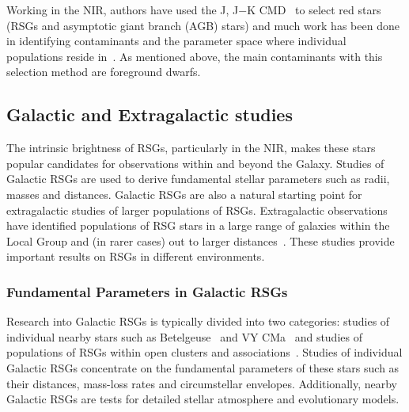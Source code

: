 Working in the NIR, authors have used the J, J$-$K CMD~\citep{2000ApJ...542..804N,2006A&A...452..195C,Neugent12} to select red stars (RSGs and asymptotic giant branch (AGB) stars) and much work has been done in identifying contaminants and the parameter space where individual populations reside in~\citep{2006A&A...452..195C}.
As mentioned above, the main contaminants with this selection method are foreground dwarfs.





\subsection{Galactic and Extragalactic studies} %
\label{sub:galactic_and_extragalactic}

The intrinsic brightness of RSGs, particularly in the NIR, makes these stars popular candidates for observations within and beyond the Galaxy.
Studies of Galactic RSGs are used to derive fundamental stellar parameters such as radii, masses and distances.
Galactic RSGs are also a natural starting point for extragalactic studies of larger populations of RSGs.
Extragalactic observations have identified populations of RSG stars in a large range of galaxies within the Local Group and (in rarer cases) out to larger distances~\citep[e.g.][]{Elias85,Humphreys86, Massey06, 2007AJ....134.2474M, Groenewegen09,Massey13}. %
These studies provide important results on RSGs in different environments.

\subsubsection{Fundamental Parameters in Galactic RSGs}\label{Galactic RSGs}

Research into Galactic RSGs is typically divided into two categories: studies of individual nearby stars such as Betelgeuse~\citep[$197\pm 45$pc;][]{Harper08} and VY CMa~\citep[$1420\pm$ 120pc;][]{Wittowski12} and studies of populations of RSGs within open clusters and associations~\citep[e.g.][]{Levesque05,2012A&A...547A..15N}.
Studies of individual Galactic RSGs concentrate on the fundamental parameters of these stars such as their distances, mass-loss rates and circumstellar envelopes.
Additionally, nearby Galactic RSGs are tests for detailed stellar atmosphere and evolutionary models.

